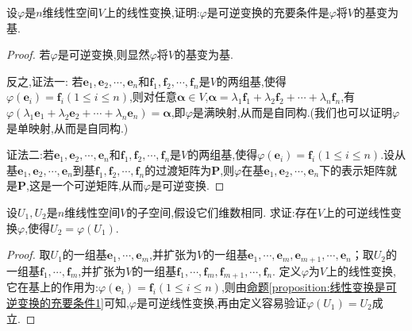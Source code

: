 \documentclass[../../main.tex]{subfiles}%
\begin{document}
\begin{proposition}\label{proposition:线性变换是可逆变换的充要条件1}
设\(\varphi\)是\(n\)维线性空间\(V\)上的线性变换,证明:\(\varphi\)是可逆变换的充要条件是\(\varphi\)将\(V\)的基变为基.
\end{proposition}
\begin{proof}

若\(\varphi\)是可逆变换,则显然\(\varphi\)将\(V\)的基变为基.

反之,{\color{blue}证法一:}
若\(\boldsymbol{e}_1,\boldsymbol{e}_2,\cdots,\boldsymbol{e}_n\)和\(\boldsymbol{f}_1,\boldsymbol{f}_2,\cdots,\boldsymbol{f}_n\)是\(V\)的两组基,使得\(\varphi(\boldsymbol{e}_i)=\boldsymbol{f}_i(1\leqslant  i\leqslant  n)\),则对任意\(\boldsymbol{\alpha}\in V\),\(\boldsymbol{\alpha}=\lambda_1\boldsymbol{f}_1+\lambda_2\boldsymbol{f}_2+\cdots+\lambda_n\boldsymbol{f}_n\),有\(\varphi(\lambda_1\boldsymbol{e}_1+\lambda_2\boldsymbol{e}_2+\cdots+\lambda_n\boldsymbol{e}_n)=\boldsymbol{\alpha}\),即\(\varphi\)是满映射,从而是自同构.(我们也可以证明\(\varphi\)是单映射,从而是自同构.) 

{\color{blue}证法二:}若\(\boldsymbol{e}_1,\boldsymbol{e}_2,\cdots,\boldsymbol{e}_n\)和\(\boldsymbol{f}_1,\boldsymbol{f}_2,\cdots,\boldsymbol{f}_n\)是\(V\)的两组基,使得\(\varphi(\boldsymbol{e}_i)=\boldsymbol{f}_i(1\leqslant  i\leqslant  n)\).设从基\(\boldsymbol{e}_1,\boldsymbol{e}_2,\cdots,\boldsymbol{e}_n\)到基\(\boldsymbol{f}_1,\boldsymbol{f}_2,\cdots,\boldsymbol{f}_n\)的过渡矩阵为\(\boldsymbol{P}\),则\(\varphi\)在基\(\boldsymbol{e}_1,\boldsymbol{e}_2,\cdots,\boldsymbol{e}_n\)下的表示矩阵就是\(\boldsymbol{P}\),这是一个可逆矩阵,从而\(\varphi\)是可逆变换. 

\end{proof}

\begin{proposition}\label{proposition:两个维数相同的线性空间一定可以通过一个可逆线性变换联系起来}
设\(U_1,U_2\)是\(n\)维线性空间\(V\)的子空间,假设它们维数相同. 求证:存在\(V\)上的可逆线性变换\(\varphi\),使得\(U_2 = \varphi(U_1)\).
\end{proposition}
\begin{proof}

取\(U_1\)的一组基\(\boldsymbol{e}_1,\cdots,\boldsymbol{e}_m\),并扩张为\(V\)的一组基\(\boldsymbol{e}_1,\cdots,\boldsymbol{e}_m,\boldsymbol{e}_{m + 1},\cdots,\boldsymbol{e}_n\)；取\(U_2\)的一组基\(\boldsymbol{f}_1,\cdots,\boldsymbol{f}_m\),并扩张为\(V\)的一组基\(\boldsymbol{f}_1,\cdots,\boldsymbol{f}_m,\boldsymbol{f}_{m + 1},\cdots,\boldsymbol{f}_n\). 定义\(\varphi\)为\(V\)上的线性变换,它在基上的作用为:\(\varphi(\boldsymbol{e}_i)=\boldsymbol{f}_i(1\leqslant  i\leqslant  n)\),则由\hyperref[proposition:线性变换是可逆变换的充要条件1]{命题\ref{proposition:线性变换是可逆变换的充要条件1}}可知,\(\varphi\)是可逆线性变换,再由定义容易验证\(\varphi(U_1)=U_2\)成立. 

\end{proof}
\end{document}
